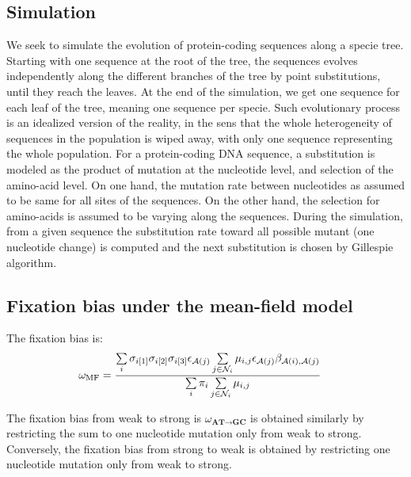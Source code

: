 \subsection{Simulation}
\label{sec-mut-bias:simu}
We seek to simulate the evolution of protein-coding sequences along a specie tree.
Starting with one sequence at the root of the tree, the sequences evolves independently along the different branches of the tree by point \glspl{substitution}, until they reach the leaves.
At the end of the simulation, we get one sequence for each leaf of the tree, meaning one sequence per specie.
Such evolutionary process is an idealized version of the reality, in the sens that the whole heterogeneity of sequences in the population is wiped away, with only one sequence representing the whole population.
For a protein-coding \acrshort{DNA} sequence, a \gls{substitution} is modeled as the product of mutation at the nucleotide level, and selection of the amino-acid level.
On one hand, the mutation rate between nucleotides as assumed to be same for all sites of the sequences.
On the other hand, the selection for amino-acids is assumed to be varying along the sequences.
During the simulation, from a given sequence the \gls{substitution} rate toward all possible mutant (one nucleotide change) is computed and the next \gls{substitution} is chosen by Gillespie algorithm.

\subsection{Fixation bias under the mean-field model}
\label{sec-mut-bias:mean-field-omega}

The fixation bias is:
\begin{align}
    \omega_{\text{MF}} & = \dfrac{ \sum\limits_{i} \sigma_{{i}[1]}\sigma_{{i}[2]}\sigma_{{i}[3]} \epsilon_{\mathcal{A}({j})} \sum\limits_{j \in \mathcal{N}_{{i}}} \mu_{{i}, {j}} \epsilon_{\mathcal{A}({j})} \beta_{\mathcal{A}({i}), \mathcal{A}({j})} }{\sum\limits_{i} \pi_{i} \sum\limits_{j \in \mathcal{N}_{{i}} } \mu_{{i}, {j}}}
\end{align}

The fixation bias from weak to strong is $\omega_{\textbf{AT} \rightarrow \textbf{GC}}$ is obtained similarly by restricting the sum to one nucleotide mutation only from weak to strong.
Conversely, the fixation bias from strong to weak is obtained by restricting one nucleotide mutation only from weak to strong.